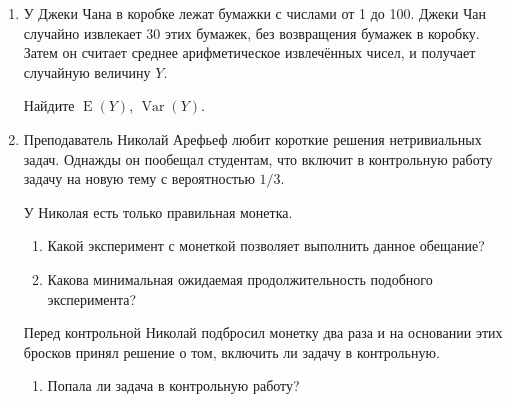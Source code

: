 \documentclass[12pt]{article}
\DeclareMathOperator{\Var}{Var}
\DeclareMathOperator{\E}{E}
\begin{document}
\begin{enumerate}
\item У Джеки Чана в коробке лежат бумажки с числами от 1 до 100. 
Джеки Чан случайно извлекает 30 этих бумажек, без возвращения бумажек в коробку.
Затем он считает среднее арифметическое извлечённых чисел, и получает случайную величину $Y$.

Найдите $\E(Y)$, $\Var(Y)$.

\item Преподаватель Николай Арефьеф любит короткие решения нетривиальных
задач. 
Однажды он пообещал студентам, что включит в контрольную
работу задачу на новую тему с вероятностью $1/3$.

У Николая есть только правильная монетка.

\begin{enumerate}
\item Какой эксперимент с монеткой позволяет выполнить данное обещание?
\item Какова минимальная ожидаемая продолжительность подобного эксперимента?
\end{enumerate}

Перед контрольной Николай подбросил монетку два раза и на основании этих
бросков принял решение о том, включить ли задачу в контрольную.

\begin{enumerate}[resume]
  \item Попала ли задача в контрольную работу?
\end{enumerate}


\end{enumerate}
\end{document}
